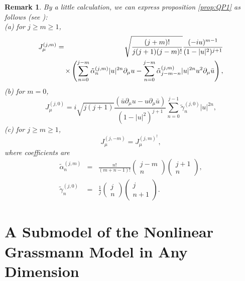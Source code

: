 \documentclass[makeidx,12pt,openany]{report}
\newtheorem{rmk}[df]{Remark}
\begin{document}
\begin{rmk}By a little calculation, we can express proposition 
\ref{prop:QP1} as follows (see \cite{FS1}): \\
(a) for $j \geq m \geq 1$, 
 \begin{eqnarray}
   J_{\mu}^{(j,m)} &=&
    \sqrt{\frac{(j+m)!}{j(j+1)(j-m)!}}
    \frac{(-iu)^{m-1}}{(1-|u|^2)^{j+1}} \nonumber\\
  && \hspace{-3mm} \times
   \left(  
    \sum_{n=0}^{j-m} \tilde{\alpha} _n^{(j,m)} |u|^{2n} \partial_{\mu}u -
    \sum_{n=0}^{j-m} \tilde{\alpha} _{j-m-n}^{(j,m)} |u|^{2n} u^2 \partial_{\mu}\bar{u}
   \right) ,
 \end{eqnarray}
(b) for $m=0$, 
 \begin{equation}
   J_{\mu}^{(j,0)}=
     i \sqrt{j(j+1)}
    \frac{(\bar{u} \partial_{\mu} u - u \partial_{\mu} \bar{u})}
         {(1-|u|^2)^{j+1}} 
    \sum_{n=0}^{j-1} \tilde{\gamma}_n^{(j,0)} |u|^{2n} , 
 \end{equation}
(c) for $j \geq m \geq 1$, 
\begin{equation}
  J_{\mu}^{(j,-m)}=J_{\mu}^{(j,m)^{\dag}}, 
\end{equation}
where coefficients are
\begin{eqnarray}
 \tilde{\alpha} _n^{(j,m)} &=&
   \frac{n!}{(m+n-1)!} 
    \left(
     \begin{array}{c}
      j-m \\
       n  
     \end{array}
    \right)
    \left(
     \begin{array}{c}
       j+1 \\
        n  
     \end{array}
    \right) , \\
   \tilde{\gamma}_n^{(j,0)} &=&
   \frac{1}{j} 
    \left(
     \begin{array}{c}
       j \\
       n  
     \end{array}
    \right)
    \left(
     \begin{array}{c}
        j \\
       n+1  
     \end{array}
    \right) .
\end{eqnarray}
\end{rmk}
\part{A Submodel of the Nonlinear Grassmann Model in Any Dimension}
\end{document}
